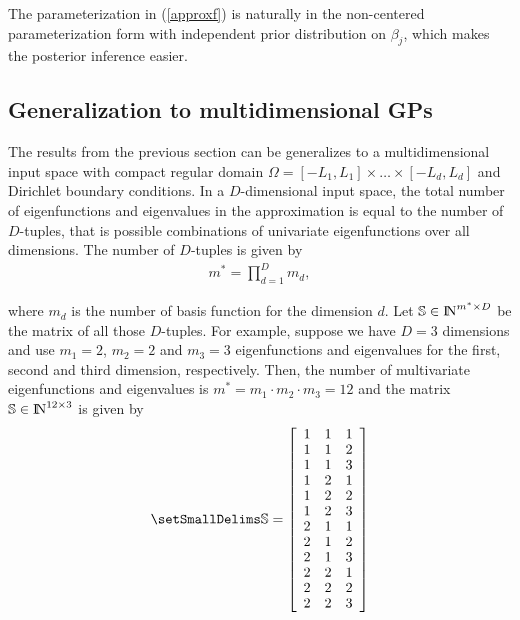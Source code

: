 \documentclass[]{interact}
\theoremstyle{plain}%
\theoremstyle{definition}
\theoremstyle{remark}
\begin{document}
The parameterization in (\ref{approxf}) is naturally in the non-centered
parameterization form with independent prior distribution on
$\beta_j$, which makes the posterior inference easier.

\subsection{Generalization to multidimensional GPs}

The results from the previous section can be generalizes to a multidimensional input space with compact regular domain $\Omega=[-L_1,L_1] \times \dots \times [-L_d,L_d]$ and Dirichlet boundary conditions. 
In a $D$-dimensional input space, the total number of eigenfunctions and eigenvalues in the approximation is equal to the number of $D$-tuples, that is possible combinations of univariate eigenfunctions over all dimensions. The number of $D$-tuples is given by 
%
\begin{align} \label{m_multi}
m^{\ast} = \prod_{d=1}^{D} m_d,
\end{align}

\noindent where $m_d$ is the number of basis function for the dimension $d$. Let $\mathbb{S}\in {\rm I\!N}^{m^{\ast} \times D}$ be the matrix of all those $D$-tuples. For example, suppose we have $D=3$ dimensions and use $m_{1}=2$, $m_{2}=2$ and $m_{3}=3$ eigenfunctions and eigenvalues for the first, second and third dimension, respectively. Then, the number of multivariate eigenfunctions and eigenvalues is $m^{\ast} = m_{1} \cdot m_{2} \cdot m_{3} = 12$ and the matrix $\mathbb{S}\in {\rm I\!N}^{12 \times 3}$ is given by
\begin{align}\small
\mathbb{S}=
\left[ {\begin{array}{ccc}
1 & 1 & 1 \nonumber \\
1 & 1 & 2 \\
1 & 1 & 3 \\
1 & 2 & 1 \\
1 & 2 & 2 \\
1 & 2 & 3 \\
2 & 1 & 1 \\
2 & 1 & 2 \\
2 & 1 & 3 \\
2 & 2 & 1 \\
2 & 2 & 2 \\
2 & 2 & 3 
\end{array} } \right]
\end{align} 
\end{document}
